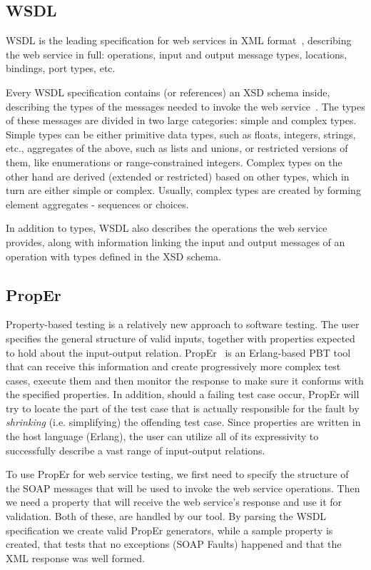 \documentclass[copyright]{eptcs}
\begin{document}
\subsection{WSDL}

WSDL is the leading specification for web services in XML
format~\cite{wsdl_spec}, describing the web service in full:
operations, input and output message types, locations, bindings, port
types, etc.

Every WSDL specification contains (or references) an XSD schema
inside, describing the types of the messages needed to invoke the web
service~\cite{xsd_structure_spec,xsd_datatypes_spec}. The types of
these messages are divided in two large categories: simple and complex
types. Simple types can be either primitive data types, such as
floats, integers, strings, etc., aggregates of the above, such as
lists and unions, or restricted versions of them, like enumerations or
range-constrained integers. Complex types on the other hand are
derived (extended or restricted) based on other types, which in turn
are either simple or complex. Usually, complex types are created by
forming element aggregates - sequences or choices.

In addition to types, WSDL also describes the operations the web
service provides, along with information linking the input and output
messages of an operation with types defined in the XSD schema.

\subsection{PropEr}

Property-based testing is a relatively new approach to software
testing. The user specifies the general structure of valid inputs,
together with properties expected to hold about the input-output
relation. PropEr~\cite{proper_tool} is an Erlang-based PBT tool that
can receive this information and create progressively more complex
test cases, execute them and then monitor the response to make sure it
conforms with the specified properties. In addition, should a failing
test case occur, PropEr will try to locate the part of the test case
that is actually responsible for the fault by \emph{shrinking} (i.e.
simplifying) the offending test case. Since properties are written in
the host language (Erlang), the user can utilize all of its
expressivity to successfully describe a vast range of input-output
relations.

To use PropEr for web service testing, we first need to specify the structure
of the SOAP messages that will be used to invoke the web service operations. 
Then we need a property that will receive the web service's response and use 
it for validation. Both of these, are handled by our tool. By parsing the 
WSDL specification we create valid PropEr generators, while a sample property
is created, that tests that no exceptions (SOAP Faults) happened and that the 
XML response was well formed.
\end{document}

